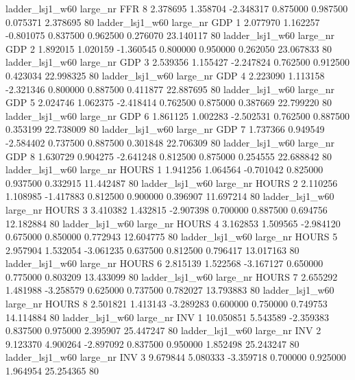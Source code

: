     ladder_lsj1_w60   large_nr      FFR                 8  2.378695  1.358704  -2.348317 0.875000 0.987500  0.075371    2.378695 80
    ladder_lsj1_w60   large_nr      GDP                 1  2.077970  1.162257  -0.801075 0.837500 0.962500  0.276070   23.140117 80
    ladder_lsj1_w60   large_nr      GDP                 2  1.892015  1.020159  -1.360545 0.800000 0.950000  0.262050   23.067833 80
    ladder_lsj1_w60   large_nr      GDP                 3  2.539356  1.155427  -2.247824 0.762500 0.912500  0.423034   22.998325 80
    ladder_lsj1_w60   large_nr      GDP                 4  2.223090  1.113158  -2.321346 0.800000 0.887500  0.411877   22.887695 80
    ladder_lsj1_w60   large_nr      GDP                 5  2.024746  1.062375  -2.418414 0.762500 0.875000  0.387669   22.799220 80
    ladder_lsj1_w60   large_nr      GDP                 6  1.861125  1.002283  -2.502531 0.762500 0.887500  0.353199   22.738009 80
    ladder_lsj1_w60   large_nr      GDP                 7  1.737366  0.949549  -2.584402 0.737500 0.887500  0.301848   22.706309 80
    ladder_lsj1_w60   large_nr      GDP                 8  1.630729  0.904275  -2.641248 0.812500 0.875000  0.254555   22.688842 80
    ladder_lsj1_w60   large_nr    HOURS                 1  1.941256  1.064564  -0.701042 0.825000 0.937500  0.332915   11.442487 80
    ladder_lsj1_w60   large_nr    HOURS                 2  2.110256  1.108985  -1.417883 0.812500 0.900000  0.396907   11.697214 80
    ladder_lsj1_w60   large_nr    HOURS                 3  3.410382  1.432815  -2.907398 0.700000 0.887500  0.694756   12.182884 80
    ladder_lsj1_w60   large_nr    HOURS                 4  3.162853  1.509565  -2.984120 0.675000 0.850000  0.772943   12.604775 80
    ladder_lsj1_w60   large_nr    HOURS                 5  2.957904  1.532054  -3.061235 0.637500 0.812500  0.796417   13.017163 80
    ladder_lsj1_w60   large_nr    HOURS                 6  2.815139  1.522568  -3.167127 0.650000 0.775000  0.803209   13.433099 80
    ladder_lsj1_w60   large_nr    HOURS                 7  2.655292  1.481988  -3.258579 0.625000 0.737500  0.782027   13.793883 80
    ladder_lsj1_w60   large_nr    HOURS                 8  2.501821  1.413143  -3.289283 0.600000 0.750000  0.749753   14.114884 80
    ladder_lsj1_w60   large_nr      INV                 1 10.050851  5.543589  -2.359383 0.837500 0.975000  2.395907   25.447247 80
    ladder_lsj1_w60   large_nr      INV                 2  9.123370  4.900264  -2.897092 0.837500 0.950000  1.852498   25.243247 80
    ladder_lsj1_w60   large_nr      INV                 3  9.679844  5.080333  -3.359718 0.700000 0.925000  1.964954   25.254365 80
